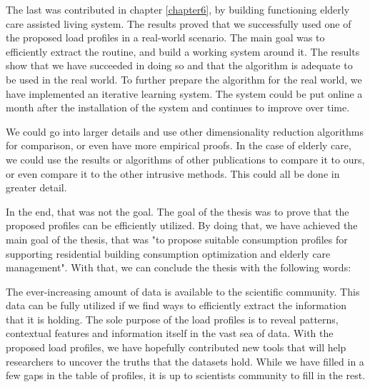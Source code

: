 The last was contributed in chapter \ref{chapter6}, by building functioning elderly care assisted living system. 
The results proved that we successfully used one of the proposed load profiles in a real-world scenario. 
The main goal was to efficiently extract the routine, and build a working system around it.
The results show that we have succeeded in doing so and that the algorithm is adequate to be used in the real world.
To further prepare the algorithm for the real world, we have implemented an iterative learning system.
The system could be put online a month after the installation of the system and continues to improve over time.

We could go into larger details and use other dimensionality reduction algorithms for comparison, or even have more empirical proofs. 
In the case of elderly care, we could use the results or algorithms of other publications to compare it to ours, or even compare it to the other intrusive methods. 
This could all be done in greater detail.

In the end, that was not the goal.
The goal of the thesis was to prove that the proposed profiles can be efficiently utilized. 
By doing that, we have achieved the main goal of the thesis,
that was "to propose suitable consumption profiles for supporting residential building consumption optimization and elderly care management".
With that, we can conclude the thesis with the following words:

The ever-increasing amount of data is available to the scientific community.
This data can be fully utilized if we find ways to efficiently extract the information that it is holding.
The sole purpose of the load profiles is to reveal patterns, contextual features and information itself in the vast sea of data.
With the proposed load profiles, we have hopefully contributed new tools that will help researchers to uncover the truths that the datasets hold. 
While we have filled in a few gaps in the table of profiles, it is up to scientists community to fill in the rest.